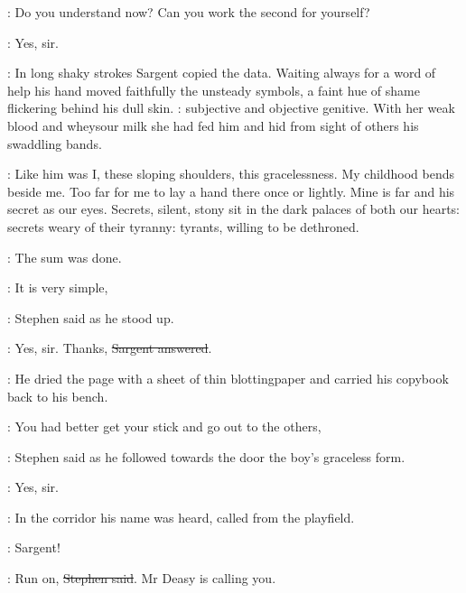 \Stephen:
Do you understand now?
Can you work the second for yourself?

\sargent:
Yes, sir.

:
In long shaky strokes Sargent copied the data.
Waiting always for a word of help
his hand moved faithfully the unsteady symbols,
a faint hue of shame flickering behind his dull skin.
: subjective and objective genitive.
With her weak blood and wheysour milk
she had fed him and hid from sight of others his swaddling bands.

\StephenInt:
Like him was I, these sloping shoulders, this gracelessness.
My childhood bends beside me.
Too far for me to lay a hand there once or lightly.
Mine is far and his secret as our eyes.
Secrets, silent, stony sit in the dark palaces of both our hearts:
secrets weary of their tyranny:
tyrants, willing to be dethroned.

:
The sum was done.

\Stephen:
It is very simple,

:
Stephen said as he stood up.

\sargent:
Yes, sir.
Thanks, \sout{Sargent answered}.

:
He dried the page with a sheet of thin blottingpaper
and carried his copybook back to his bench.

\Stephen:
You had better get your stick and go out to the others,

:
Stephen said as he followed towards the door the boy's graceless form.

\sargent:
Yes, sir.

:
In the corridor his name was heard, called from the playfield.

\deasy:
Sargent!

\Stephen:
Run on, \sout{Stephen said}.
Mr Deasy is calling you.
